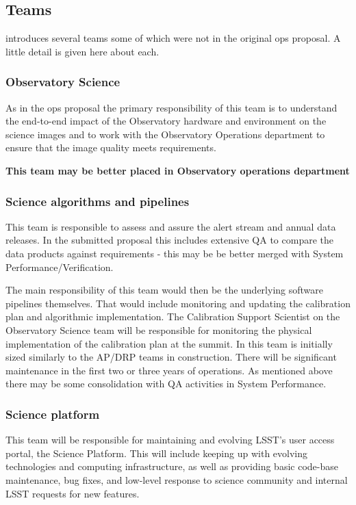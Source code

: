 \newpage
\subsection{Teams }\label{sec:teams}
 introduces several teams some of which were not in the original ops proposal. A little detail is given here about each.

\subsubsection{Observatory Science}
As in the ops proposal the primary responsibility of this team is to understand the end-to-end impact of the Observatory hardware and environment on the science images and to work with the Observatory Operations department to ensure that the image quality meets requirements.

\textbf{This team may be better placed  in Observatory operations department }

\subsubsection{Science algorithms and pipelines}
This team is responsible to assess and assure the alert stream and annual data releases.
In the submitted proposal this includes extensive \gls{QA} to compare the data products against requirements -
this may be be better merged with System Performance/Verification.

The main responsibility  of this team  would then be the  underlying \gls{software} pipelines themselves.
That would include monitoring and updating the calibration plan and algorithmic implementation. The Calibration Support Scientist on the Observatory Science team will be responsible for monitoring the physical implementation of the calibration plan at the summit.
In  this team is initially sized similarly to the AP/DRP teams in construction. There will be significant maintenance in the first two or three years of operations. As mentioned above there may be some consolidation with \gls{QA} activities in System Performance.

\subsubsection{Science platform  }
This team will be responsible for maintaining and evolving LSST’s user access portal, the Science Platform. This will include keeping up with evolving technologies and computing infrastructure, as well as providing basic code-base maintenance, bug fixes, and low-level response to science community and internal \gls{LSST} requests for new features.


